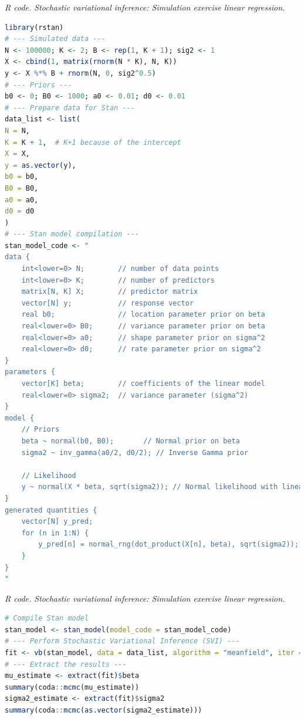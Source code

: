 \begin{enumerate}[leftmargin=*]
\begin{tcolorbox}[enhanced,width=4.67in,center upper,
	fontupper=\large\bfseries,drop shadow southwest,sharp corners]
	\textit{R code. Stochastic variational inference: Simulation exercise linear regression.}
	\begin{VF}
		\begin{lstlisting}[language=R]
library(rstan)
# --- Simulated data ---
N <- 100000; K <- 2; B <- rep(1, K + 1); sig2 <- 1
X <- cbind(1, matrix(rnorm(N * K), N, K))
y <- X %*% B + rnorm(N, 0, sig2^0.5)
# --- Priors ---
b0 <- 0; B0 <- 1000; a0 <- 0.01; d0 <- 0.01
# --- Prepare data for Stan ---
data_list <- list(
N = N,
K = K + 1,  # K+1 because of the intercept
X = X,
y = as.vector(y),
b0 = b0,
B0 = B0,
a0 = a0,
d0 = d0
)
# --- Stan model compilation ---
stan_model_code <- "
data {
	int<lower=0> N;        // number of data points
	int<lower=0> K;        // number of predictors
	matrix[N, K] X;        // predictor matrix
	vector[N] y;           // response vector
	real b0;               // location parameter prior on beta
	real<lower=0> B0;      // variance parameter prior on beta
	real<lower=0> a0;      // shape parameter prior on sigma^2
	real<lower=0> d0;      // rate parameter prior on sigma^2
}
parameters {
	vector[K] beta;        // coefficients of the linear model
	real<lower=0> sigma2;  // variance parameter (sigma^2)
}
model {
	// Priors
	beta ~ normal(b0, B0);       // Normal prior on beta
	sigma2 ~ inv_gamma(a0/2, d0/2); // Inverse Gamma prior
	
	// Likelihood
	y ~ normal(X * beta, sqrt(sigma2)); // Normal likelihood with linear predictor
}
generated quantities {
	vector[N] y_pred;
	for (n in 1:N) {
		y_pred[n] = normal_rng(dot_product(X[n], beta), sqrt(sigma2));
	}
}
"
\end{lstlisting}
	\end{VF}
\end{tcolorbox}

\begin{tcolorbox}[enhanced,width=4.67in,center upper,
	fontupper=\large\bfseries,drop shadow southwest,sharp corners]
	\textit{R code. Stochastic variational inference: Simulation exercise linear regression.}
	\begin{VF}
		\begin{lstlisting}[language=R]
# Compile Stan model
stan_model <- stan_model(model_code = stan_model_code)
# --- Perform Stochastic Variational Inference (SVI) ---
fit <- vb(stan_model, data = data_list, algorithm = "meanfield", iter = 10000)
# --- Extract the results ---
mu_estimate <- extract(fit)$beta
summary(coda::mcmc(mu_estimate))
sigma2_estimate <- extract(fit)$sigma2
summary(coda::mcmc(as.vector(sigma2_estimate)))
		\end{lstlisting}
	\end{VF}
\end{tcolorbox}


\end{enumerate}
